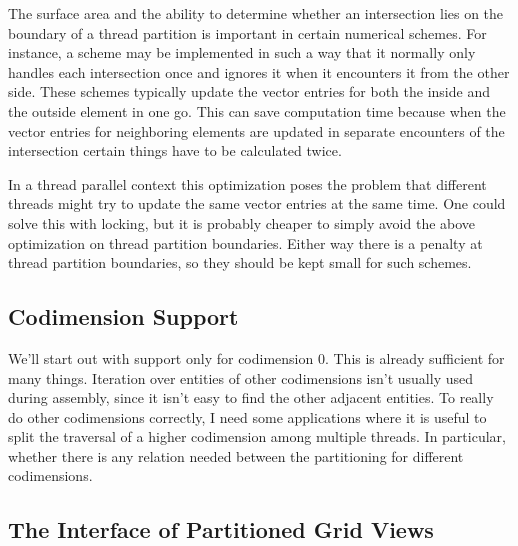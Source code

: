 \documentclass{article}
\begin{document}
The surface area and the ability to determine whether an intersection lies on
the boundary of a thread partition is important in certain numerical schemes.
For instance, a scheme may be implemented in such a way that it normally only
handles each intersection once and ignores it when it encounters it from the
other side.  These schemes typically update the vector entries for both the
inside and the outside element in one go.  This can save computation time
because when the vector entries for neighboring elements are updated in
separate encounters of the intersection certain things have to be calculated
twice.

In a thread parallel context this optimization poses the problem that
different threads might try to update the same vector entries at the same
time.  One could solve this with locking, but it is probably cheaper to simply
avoid the above optimization on thread partition boundaries.  Either way there
is a penalty at thread partition boundaries, so they should be kept small for
such schemes.

\subsection{Codimension Support}

We'll start out with support only for codimension $0$.  This is already
sufficient for many things.  Iteration over entities of other codimensions
isn't usually used during assembly, since it isn't easy to find the other
adjacent entities.  To really do other codimensions correctly, I need some
applications where it is useful to split the traversal of a higher codimension
among multiple threads.  In particular, whether there is any relation needed
between the partitioning for different codimensions.

\subsection{The Interface of Partitioned Grid Views}
\end{document}
